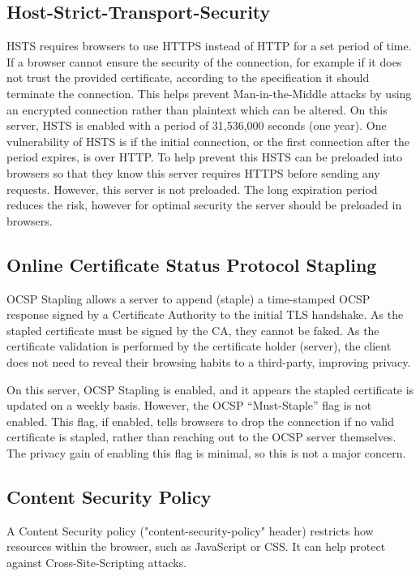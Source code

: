 \documentclass[12pt]{article}
\begin{document}
  \subsection{Host-Strict-Transport-Security}
  HSTS requires browsers to use HTTPS instead of HTTP for a set period of time.
  If a browser cannot ensure the security of the connection, for example if it does not trust the provided certificate, according to the specification it should terminate the connection.
  This helps prevent Man-in-the-Middle attacks by using an encrypted connection rather than plaintext which can be altered.
  On this server, HSTS is enabled with a period of 31,536,000 seconds (one year).
  One vulnerability of HSTS is if the initial connection, or the first connection after the period expires, is over HTTP.
  To help prevent this HSTS can be preloaded into browsers so that they know this server requires HTTPS before sending any requests.
  However, this server is not preloaded.
  The long expiration period reduces the risk, however for optimal security the server should be preloaded in browsers.

  \subsection{Online Certificate Status Protocol Stapling}
  OCSP Stapling allows a server to append (staple) a time-stamped OCSP response signed by a Certificate Authority to the initial TLS handshake.
  As the stapled certificate must be signed by the CA, they cannot be faked.
  As the certificate validation is performed by the certificate holder (server), the client does not need to reveal their browsing habits to a third-party, improving privacy.

  On this server, OCSP Stapling is enabled, and it appears the stapled certificate is updated on a weekly basis.
  However, the OCSP ``Must-Staple'' flag is not enabled.
  This flag, if enabled, tells browsers to drop the connection if no valid certificate is stapled, rather than reaching out to the OCSP server themselves.
  The privacy gain of enabling this flag is minimal, so this is not a major concern.

  \subsection{Content Security Policy}
  A Content Security policy ("content-security-policy" header) restricts how resources within the browser, such as JavaScript or CSS.
  It can help protect against Cross-Site-Scripting attacks.
\end{document}
